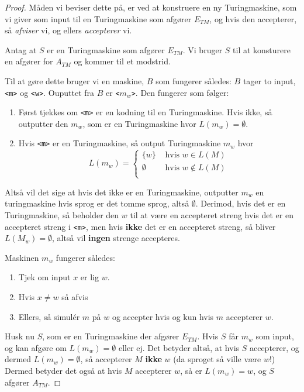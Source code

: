 \begin{proof}
Måden vi beviser dette på, er ved at konstruere en ny Turingmaskine, som vi giver som input til en Turingmaskine som afgører $E_{TM}$, og hvis den accepterer, så \textit{afviser} vi, og ellers \textit{accepterer} vi.

	Antag at $S$ er en Turingmaskine som afgører $E_{TM}$. Vi bruger $S$ til at konsturere en afgører for $A_{TM}$ og kommer til et modstrid.

	Til at gøre dette bruger vi en maskine, $B$ som fungerer således: $B$ tager to input, \texttt{<m>} og \texttt{<w>}. Ouputtet fra $B$  er \texttt{<$m_{w}$>}. Den fungerer som følger:
	\begin{enumerate}
		\item Først tjekkes om \texttt{<m>} er en kodning til en Turingmaskine. Hvis ikke, så outputter den $m_{w}$, som er en Turingmaskine hvor $L(m_{w}) = \emptyset$.
		\item Hvis \texttt{<m>} er en Turingmaskine, så output Turingmaskine $m_{w}$ hvor
		      \begin{equation*}
			      L(m_{w}) =\begin{cases}
				      \{w\}     & \text{ hvis } w \in L(M)    \\
				      \emptyset & \text{ hvis } w \notin L(M) \\
			      \end{cases}
		      \end{equation*}
	\end{enumerate}
	Altså vil det sige at hvis det ikke er en Turingmaskine, outputter $m_{w}$ en turingmaskine hvis sprog er det tomme sprog, altså $\emptyset$. Derimod, hvis det er en Turingmaskine, så beholder den $w$ til at være en accepteret streng hvis det er en accepteret streng i \texttt{<m>}, men hvis \textbf{ikke} det er en accepteret streng, så bliver $L(M_{w}) = \emptyset$, altså vil \textbf{ingen} strenge accepteres.

	Maskinen $m_{w}$ fungerer således:
	\begin{enumerate}
		\item Tjek om input $x$ er lig $w$.
		\item Hvis $x \neq w$ så afvis
		\item Ellers, så simulér $m$ på $w$ og accepter hvis og kun hvis $m$ accepterer $w$.
	\end{enumerate}

	Husk nu $S$, som er en Turingmaskine der afgører $E_{TM}$. Hvis $S$ får $m_{w}$ som input, og kan afgøre om $L(m_{w}) = \emptyset$ eller ej. Det betyder altså, at hvis $S$ accepterer, og dermed $L(m_{w}) = \emptyset$, så accepterer $M$ \textbf{ikke} $w$ (da sproget så ville være $w$!) Dermed betyder det også at hvis $M$ accepterer $w$, så er $L(m_{w}) = w$, og $S$ afgører $A_{TM}$.


\end{proof}
